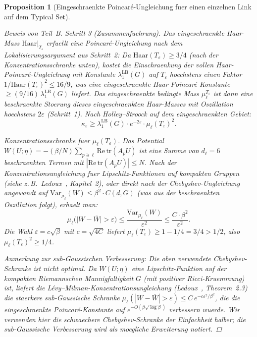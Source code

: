 \documentclass[12pt,a4paper]{article}
\theoremstyle{definition}
\theoremstyle{plain}
\newtheorem{proposition}[definition]{Proposition}
\theoremstyle{remark}
\begin{document}
\begin{proposition}[Eingeschraenkte Poincar\'e-Ungleichung fuer einen einzelnen Link auf dem Typical Set]
\begin{proof}[Beweis von Teil~B]
\emph{Schritt 3 (Zusammenfuehrung).}
Das eingeschraenkte Haar-Mass $\mathrm{Haar}|_{T_\varepsilon}$ erfuellt eine Poincar\'e-Ungleichung nach dem Lokalisierungsargument aus Schritt~2: Da $\mathrm{Haar}(T_\varepsilon) \geq 3/4$ (nach der Konzentrationsschranke unten), kostet die Einschraenkung der vollen Haar-Poincar\'e-Ungleichung mit Konstante $\lambda_1^{\mathrm{LB}}(G)$ auf $T_\varepsilon$ hoechstens einen Faktor $1/\mathrm{Haar}(T_\varepsilon)^2 \leq 16/9$, was eine eingeschraenkte Haar-Poincar\'e-Konstante $\geq (9/16)\,\lambda_1^{\mathrm{LB}}(G)$ liefert. Das eingeschraenkte bedingte Mass $\mu_\ell^{T_\varepsilon}$ ist dann eine beschraenkte Stoerung dieses eingeschraenkten Haar-Masses mit Oszillation hoechstens $2\varepsilon$ (Schritt~1). Nach Holley--Stroock auf dem eingeschraenkten Gebiet:
\[
    \kappa_\varepsilon \geq \lambda_1^{\mathrm{LB}}(G) \cdot e^{-2\varepsilon} \cdot \mu_\ell(T_\varepsilon)^2.
\]

\emph{Konzentrationsschranke fuer $\mu_\ell(T_\varepsilon)$.}
Das Potential $W(U;\eta) = -(\beta/N)\sum_{p \ni \ell} \mathrm{Re}\,\mathrm{tr}(A_p U)$ ist eine Summe von $d_\ell = 6$ beschraenkten Termen mit $|\mathrm{Re}\,\mathrm{tr}(A_p U)| \leq N$. Nach der Konzentrations\-ungleichung fuer Lipschitz-Funktionen auf kompakten Gruppen (siehe z.\,B.\ Ledoux~\cite{Ledoux2001}, Kapitel~2), oder direkt nach der Chebyshev-Ungleichung angewandt auf $\mathrm{Var}_{\mu_\ell}(W) \leq \beta^2 \cdot C(d,G)$ (was aus der beschraenkten Oszillation folgt), erhaelt man:
\[
    \mu_\ell\bigl(\bigl|W - \overline{W}\bigr| > \varepsilon\bigr) \leq \frac{\mathrm{Var}_{\mu_\ell}(W)}{\varepsilon^2} \leq \frac{C \cdot \beta^2}{\varepsilon^2}.
\]
Die Wahl $\varepsilon = c\sqrt{\beta}$ mit $c = \sqrt{4C}$ liefert $\mu_\ell(T_\varepsilon) \geq 1 - 1/4 = 3/4 > 1/2$, also $\mu_\ell(T_\varepsilon)^2 \geq 1/4$.

\emph{Anmerkung zur sub-Gaussischen Verbesserung:} Die oben verwendete Chebyshev-Schranke ist nicht optimal. Da $W(U;\eta)$ eine Lipschitz-Funktion auf der kompakten Riemannschen Mannigfaltigkeit $G$ (mit positiver Ricci-Kruemmung) ist, liefert die L\'evy--Milman-Konzentrationsungleichung (Ledoux~\cite{Ledoux2001}, Theorem~2.3) die staerkere sub-Gaussische Schranke $\mu_\ell(|W - \overline{W}| > \varepsilon) \leq C\,e^{-c\varepsilon^2/\beta^2}$, die die eingeschraenkte Poincar\'e-Konstante auf $e^{-O(\beta\sqrt{\log\beta})}$ verbessern wuerde. Wir verwenden hier die schwaechere Chebyshev-Schranke der Einfachheit halber; die sub-Gaussische Verbesserung wird als moegliche Erweiterung notiert.
\end{proof}
\end{proposition}
\end{document}
